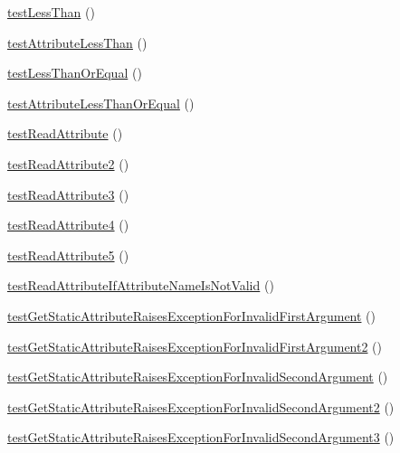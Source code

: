 \begin{DoxyCompactItemize}
\item 
\mbox{\hyperlink{class_framework___assert_test_ab0d11cf49cc4a2fbf0b0a25e6d6f0e48}{test\+Less\+Than}} ()
\item 
\mbox{\hyperlink{class_framework___assert_test_a408b333caf8071d1086173fd41c81860}{test\+Attribute\+Less\+Than}} ()
\item 
\mbox{\hyperlink{class_framework___assert_test_a5ba027f9c5e219ec4680619f9ebaa0e7}{test\+Less\+Than\+Or\+Equal}} ()
\item 
\mbox{\hyperlink{class_framework___assert_test_a1da0a6603ea9175eff5fa87cb20c68a7}{test\+Attribute\+Less\+Than\+Or\+Equal}} ()
\item 
\mbox{\hyperlink{class_framework___assert_test_a2ad044c0ddf9512620ad0eb9ff9cc423}{test\+Read\+Attribute}} ()
\item 
\mbox{\hyperlink{class_framework___assert_test_aa5039c0acb31afb55bc1d49b29855517}{test\+Read\+Attribute2}} ()
\item 
\mbox{\hyperlink{class_framework___assert_test_ae25b64493b97c0da5fe1a0667b1faa85}{test\+Read\+Attribute3}} ()
\item 
\mbox{\hyperlink{class_framework___assert_test_aa737202767ba9304702177bf7eabc963}{test\+Read\+Attribute4}} ()
\item 
\mbox{\hyperlink{class_framework___assert_test_a47d7f10b74e63d3ba474e4686c77e827}{test\+Read\+Attribute5}} ()
\item 
\mbox{\hyperlink{class_framework___assert_test_a6959001b19e7869ae03d67d1bc604929}{test\+Read\+Attribute\+If\+Attribute\+Name\+Is\+Not\+Valid}} ()
\item 
\mbox{\hyperlink{class_framework___assert_test_ac123388861cdb227872ce7424a937c48}{test\+Get\+Static\+Attribute\+Raises\+Exception\+For\+Invalid\+First\+Argument}} ()
\item 
\mbox{\hyperlink{class_framework___assert_test_acd7dd14538053762dd57526f889e7786}{test\+Get\+Static\+Attribute\+Raises\+Exception\+For\+Invalid\+First\+Argument2}} ()
\item 
\mbox{\hyperlink{class_framework___assert_test_a3829bf5405f7c41228676dcf1c14f02f}{test\+Get\+Static\+Attribute\+Raises\+Exception\+For\+Invalid\+Second\+Argument}} ()
\item 
\mbox{\hyperlink{class_framework___assert_test_ab1f83e3f92b216233de8d316611abec3}{test\+Get\+Static\+Attribute\+Raises\+Exception\+For\+Invalid\+Second\+Argument2}} ()
\item 
\mbox{\hyperlink{class_framework___assert_test_af46abee6e6228454387fe46eae8b484c}{test\+Get\+Static\+Attribute\+Raises\+Exception\+For\+Invalid\+Second\+Argument3}} ()

\end{DoxyCompactItemize}
